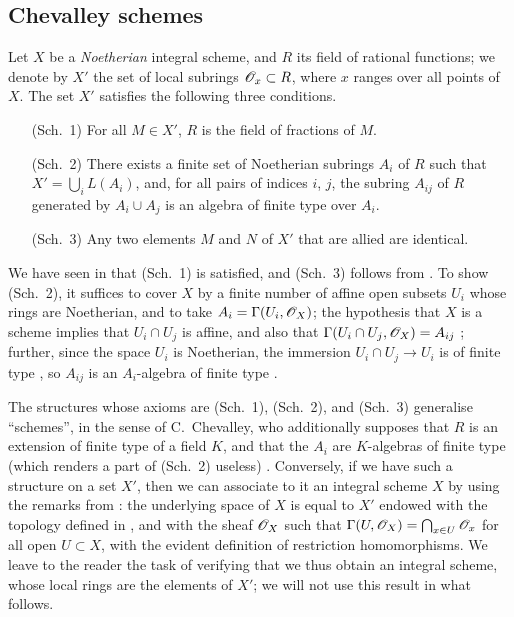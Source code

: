 \subsection{Chevalley schemes}
\label{subsection:1.8.3}

\begin{env}[8.3.1]
\label{1.8.3.1}
Let $X$ be a \emph{Noetherian} integral scheme, and $R$ its field of rational functions;
we denote by $X'$ the set of local subrings $\mathscr{O}_x\subset R$, where $x$ ranges over all points of $X$.
The set $X'$ satisfies the following three conditions.
\begin{enumerate}
  \item[(Sch.~1)] For all $M\in X'$, $R$ is the field of fractions of $M$.
  \item[(Sch.~2)] There exists a finite set of Noetherian subrings $A_i$ of $R$ such that $X'=\bigcup_i L(A_i)$, and, for all pairs of indices $i$, $j$, the subring $A_{ij}$ of $R$ generated by $A_i\cup A_j$ is an algebra of finite type over $A_i$.
  \item[(Sch.~3)] Any two elements $M$ and $N$ of $X'$ that are allied are identical.
\end{enumerate}
\end{env}

We have seen in  that (Sch.~1) is satisfied, and (Sch.~3) follows from .
To show (Sch.~2), it suffices to cover $X$ by a finite number of affine open subsets $U_i$ whose rings are Noetherian, and to take $A_i=\Gamma(U_i,\mathscr{O}_X)$;
the hypothesis that $X$ is a scheme implies that $U_i\cap U_j$ is affine, and also that $\Gamma(U_i\cap U_j,\mathscr{O}_X)=A_{ij}$ ;
further, since the space $U_i$ is Noetherian, the immersion $U_i\cap U_j\to U_i$ is of finite type , so $A_{ij}$ is an $A_i$-algebra of finite type .

\begin{env}[8.3.2]
\label{1.8.3.2}
The structures whose axioms are (Sch.~1), (Sch.~2), and (Sch.~3) generalise ``schemes'', in the sense of C.~Chevalley, who additionally supposes that $R$ is an extension of finite type of a field $K$, and that the $A_i$ are $K$-algebras of finite type (which renders a part of (Sch.~2) useless) \cite{I-1}.
Conversely, if we have such a structure on a set $X'$, then we can associate to it an integral scheme $X$ by using the remarks from : the underlying space of $X$ is equal to $X'$ endowed with the topology defined in , and with the sheaf $\mathscr{O}_X$ such that $\Gamma(U,\mathscr{O}_X)=\bigcap_{x\in U}\mathscr{O}_x$ for all open $U\subset X$, with the evident definition of restriction homomorphisms.
We leave to the reader the task of verifying that we thus obtain an integral scheme, whose local rings are the elements of $X'$;
we will not use this result in what follows.
\end{env}

